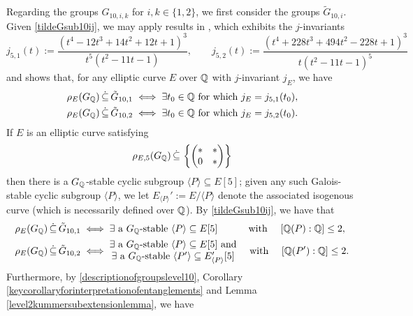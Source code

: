 Regarding the groups $G_{10,i,k}$ for $i,k \in \{1, 2\}$, we first consider the groups $\tilde{G}_{10,i}$. Given \eqref{tildeGsub10ij}, we may apply results in \cite{zywina}, which exhibits the $j$-invariants
\[
j_{5,1}(t) := \frac{(t^4 - 12t^3 + 14t^2 + 12t + 1)^3}{t^5(t^2 - 11t - 1)}, \quad\quad
j_{5,2}(t) := \frac{(t^4 + 228t^3 + 494t^2 - 228t + 1)^3}{t(t^2 - 11t - 1)^5}
\]
and shows that, for any elliptic curve $E$ over $\mathbb{Q}$ with $j$-invariant $j_E$, we have
\[
\begin{split}
\rho_{E}(G_{\mathbb{Q}}) \, \dot\subseteq \, \tilde{G}_{10,1} \; &\Longleftrightarrow \; \exists t_0 \in \mathbb{Q} \text{ for which } j_E = j_{5,1}(t_0), \\
\rho_{E}(G_{\mathbb{Q}}) \, \dot\subseteq \, \tilde{G}_{10,2} \; &\Longleftrightarrow \; \exists t_0 \in \mathbb{Q} \text{ for which } j_E = j_{5,2}(t_0).
\end{split}
\]
If $E$ is an elliptic curve satisfying $$\rho_{E,5}(G_{\mathbb{Q}}) \, \dot\subseteq \, \left\{ \begin{pmatrix} * & * \\ 0 & * \end{pmatrix} \right\}$$ then there is a $G_{\mathbb{Q}}$-stable cyclic subgroup $\langle P \rangle \subseteq E[5]$; given any such Galois-stable cyclic subgroup $\langle P \rangle$, we let $E_{\langle P \rangle}' := E/\langle P \rangle$ denote the associated isogenous curve (which is necessarily defined over $\mathbb{Q}$). By \eqref{tildeGsub10ij}, we have that
\begin{equation} \label{conditionfortildeG101andG102}
\begin{split}
\rho_{E}(G_{\mathbb{Q}}) \, \dot\subseteq \, \tilde{G}_{10,1} \; &\Longleftrightarrow \; \exists \text{ a $G_{\mathbb{Q}}$-stable } \langle P \rangle \subseteq E[5] \quad\quad\;\;\; \text{ with } \quad [ \mathbb{Q}( P ) : \mathbb{Q} ] \leq 2, \\
\rho_{E}(G_{\mathbb{Q}}) \, \dot\subseteq \, \tilde{G}_{10,2} \; &\Longleftrightarrow \; \begin{matrix} \exists \text{ a $G_{\mathbb{Q}}$-stable } \langle P \rangle \subseteq E[5] \text{ and} \\ \exists \text{ a $G_{\mathbb{Q}}$-stable } \langle P' \rangle \subseteq E_{\langle P \rangle}' [5] \end{matrix} \quad \text{ with } \quad [ \mathbb{Q}( P' ) : \mathbb{Q} ] \leq 2.
\end{split}
\end{equation}
Furthermore, by \eqref{descriptionofgroupslevel10}, Corollary \ref{keycorollaryforinterpretationofentanglements} and Lemma \ref{level2kummersubextensionlemma}, we have
